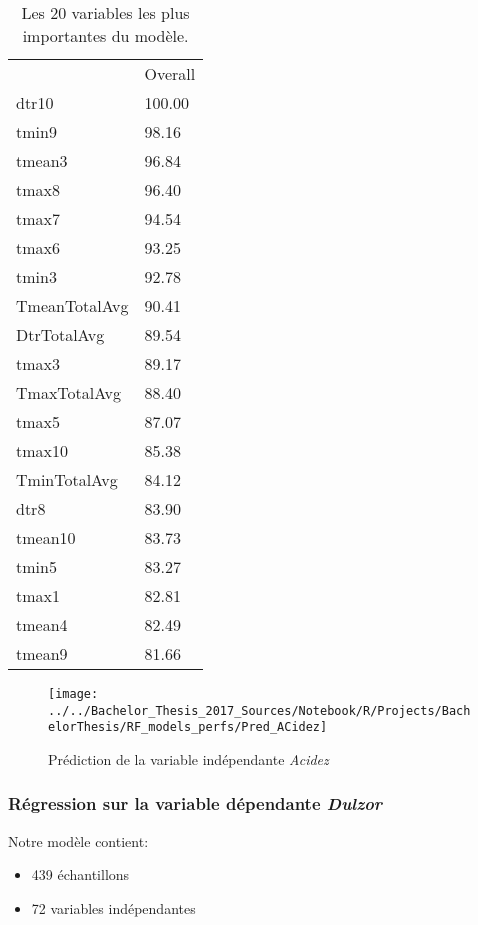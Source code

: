 \begin{table}[H]
	\centering
	\caption{Les 20 variables les plus importantes du modèle.}
	\label{RF_Acidez_Varimp}
	\begin{tabular}{ll}
	 & Overall \\
	 dtr10         & 100.00  \\
	 tmin9         & 98.16   \\
	 tmean3        & 96.84   \\
	 tmax8         & 96.40   \\
	 tmax7         & 94.54   \\
	 tmax6         & 93.25   \\
	 tmin3         & 92.78   \\
	 TmeanTotalAvg & 90.41   \\
	 DtrTotalAvg   & 89.54   \\
	 tmax3         & 89.17   \\
	 TmaxTotalAvg  & 88.40   \\
	 tmax5         & 87.07   \\
	 tmax10        & 85.38   \\
	 TminTotalAvg  & 84.12   \\
	 dtr8          & 83.90   \\
	 tmean10       & 83.73   \\
	 tmin5         & 83.27   \\
	 tmax1         & 82.81   \\
	 tmean4        & 82.49   \\
	 tmean9        & 81.66  
	\end{tabular}
\end{table}

\begin{figure}[H]
	\centering
	\texttt{[image: ../../Bachelor\_Thesis\_2017\_Sources/Notebook/R/Projects/BachelorThesis/RF\_models\_perfs/Pred\_ACidez]}
	\caption{Prédiction de la variable indépendante \textit{Acidez}}
	\label{fig:predacidez}
\end{figure}






\newpage
\subsubsection{Régression sur la variable dépendante \textit{Dulzor}}
\noindent Notre modèle contient: 
\begin{itemize}
	\item 439 échantillons
	\item 72 variables indépendantes
\end{itemize}


